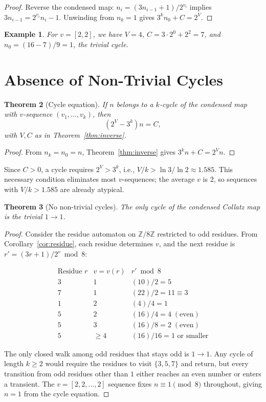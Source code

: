 \documentclass[12pt,a4paper]{article}
\newtheorem{theorem}{Theorem}[section]
\newtheorem{example}[theorem]{Example}
\newcommand{\Z}{\mathbb{Z}}
\begin{document}
\begin{proof}
Reverse the condensed map: $n_i = (3n_{i-1}+1)/2^{v_i}$ implies $3n_{i-1} = 2^{v_i}n_i - 1$. Unwinding from $n_k = 1$ gives $3^k n_0 + C = 2^V$.
\end{proof}

\begin{example}
For $v = [2,2]$, we have $V = 4$, $C = 3\cdot 2^0 + 2^2 = 7$, and $n_0 = (16 - 7)/9 = 1$, the trivial cycle.
\end{example}

\section{Absence of Non-Trivial Cycles}\label{sec:cycles}

\begin{theorem}[Cycle equation]\label{thm:cycle}
If $n$ belongs to a $k$-cycle of the condensed map with $v$-sequence $(v_1,\ldots,v_k)$, then
\[
(2^V - 3^k) n = C,
\]
with $V,C$ as in Theorem~\ref{thm:inverse}.
\end{theorem}

\begin{proof}
From $n_k = n_0 = n$, Theorem~\ref{thm:inverse} gives $3^k n + C = 2^V n$.
\end{proof}

Since $C > 0$, a cycle requires $2^V > 3^k$, i.e., $V/k > \ln 3 / \ln 2 \approx 1.585$. This necessary condition eliminates most $v$-sequences; the average $v$ is $2$, so sequences with $V/k > 1.585$ are already atypical.

\begin{theorem}[No non-trivial cycles]\label{thm:nocycles}
The only cycle of the condensed Collatz map is the trivial $1 \to 1$.
\end{theorem}

\begin{proof}
Consider the residue automaton on $\Z/8\Z$ restricted to odd residues. From Corollary~\ref{cor:residue}, each residue determines $v$, and the next residue is $r' = (3r+1)/2^v \bmod 8$:

\[
\begin{array}{c|c|c}
\text{Residue } r & v = v(r) & r' \bmod 8 \\ \hline
3 & 1 & (10)/2 = 5 \\
7 & 1 & (22)/2 = 11 \equiv 3 \\
1 & 2 & (4)/4 = 1 \\
5 & 2 & (16)/4 = 4 \;(\text{even}) \\
5 & 3 & (16)/8 = 2 \;(\text{even}) \\
5 & \ge 4 & (16)/16 = 1 \text{ or smaller}
\end{array}
\]

The only closed walk among odd residues that stays odd is $1 \to 1$. Any cycle of length $k \ge 2$ would require the residues to visit $\{3,5,7\}$ and return, but every transition from odd residues other than $1$ either reaches an even number or enters a transient. The $v = [2,2,\ldots,2]$ sequence fixes $n \equiv 1 \pmod 8$ throughout, giving $n = 1$ from the cycle equation.
\end{proof}
\end{document}
